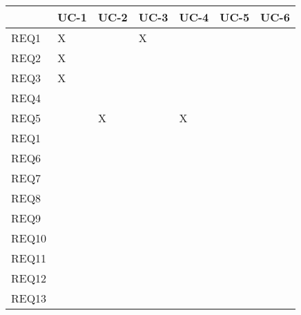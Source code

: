 \documentclass[11pt]{article}
\begin{document}
\begin{center}
\begin{tabular}{|l|l|l|l|l|l|l|}
\hline
& UC-1 & UC-2 & UC-3 & UC-4 & UC-5 & UC-6 \\ \hline
REQ1 & X &  & X  &  &  &  \\ \hline
REQ2 & X &  &  &  &  &  \\ \hline
REQ3 & X &  &  &  &  &  \\ \hline
REQ4 &  &  &  &  &  &  \\ \hline
REQ5 &  & X &  &  X&  &  \\ \hline
REQ1 &  &  &  &  &  &  \\  \hline
REQ6 &  &  &  &  &  &  \\ \hline
REQ7 &  &  &  &  &  &  \\ \hline
REQ8 &  &  &  &  &  &  \\ \hline
REQ9 &  &  &  &  &  &  \\ \hline
REQ10 &  &  &  &  &  &  \\ \hline
REQ11 &  &  &  &  &  &  \\ \hline
REQ12 &  &  &  &  &  &  \\ \hline
REQ13 &  &  &  &  &  & \\ \hline
\end{tabular}
\end{center}
\end{document}
